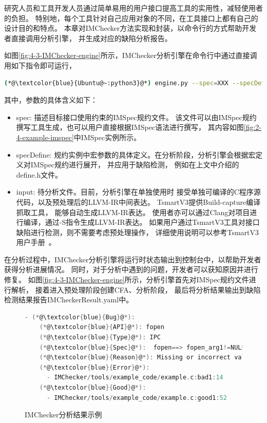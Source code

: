 研究人员和工具开发人员通过简单易用的用户接口提高工具的实用性，减轻使用者的负担。
特别地，每个工具针对自己应用对象的不同，在工具接口上都有自己的设计目的和特点。
本章对IMChecker方法实现和封装，以命令行的方式帮助开发者直接调用分析引擎，
并生成对应的缺陷分析报告。

如图\ref{fig:4-3-IMChecker-engine}所示，IMChecker分析引擎在命令行中通过直接调用如下指令即可运行，
\begin{lstlisting}[language={bash},
basicstyle=\linespread{0.8}\listingsfont,
numbers=none,
xleftmargin=.1\textwidth]
(*@\textcolor{blue}{Ubuntu@~:python3}@*) engine.py --spec=XXX --specDefine=XXX --input=XXX
\end{lstlisting}
其中，参数的具体含义如下：
\begin{itemize}
	\item spec: 描述目标接口使用约束的IMSpec规约文件。
	该文件可以由IMSpec规约撰写工具生成，也可以用户直接根据IMSpec语法进行撰写，
	其内容如图\ref{fig:2-4-example-imspec}中IMSpec实例所示。
	\item specDefine: 规约实例中宏参数的具体定义。在分析阶段，分析引擎会根据宏定义对IMSpec规约进行展开，
	并应用于缺陷检测，
	例如在上文中介绍的define.h文件。
	\item input: 待分析文件。目前，分析引擎在单独使用时
	接受单独可编译的C程序源代码，以及预处理后的LLVM-IR中间表达。
	TsmartV3提供Build-capture编译抓取工具，
	能够自动生成LLVM-IR表达。
	使用者亦可以通过Clang对项目进行编译，通过-S指令生成LLVM-IR表达。
	如果用户通过TsmartV3工具对接口缺陷进行检测，则不需要考虑预处理操作，
	详细使用说明可以参考TsmartV3用户手册~\cite{tsmart}。
\end{itemize}

在分析过程中，IMChecker分析引擎将运行时状态输出到控制台中，以帮助开发者获得分析进展情况。
同时，对于分析中遇到的问题，开发者可以获知原因并进行修复。
如图\ref{fig:4-3-IMChecker-engine}所示，分析引擎首先对IMSpec规约文件进行解析，
接着进入预处理阶段创建CFA、分析阶段，
最后将分析结果输出到缺陷检测结果报告IMCheckerResult.yaml中。

\begin{figure}[b]
	\centering
	\begin{minipage}{0.7\linewidth}
\begin{lstlisting}[language={C},
basicstyle=\linespread{0.7}\listingsfont,
numbers=none,frame=trBL,
xleftmargin=0pt]
  - (*@\textcolor{blue}{Bug}@*):
    (*@\textcolor{blue}{API}@*): fopen
    (*@\textcolor{blue}{Type}@*): IPC
    (*@\textcolor{blue}{Spec}@*):  fopen==> fopen_arg1!=NULL
    (*@\textcolor{blue}{Reason}@*): Missing or incorrect validation of parameter
    (*@\textcolor{blue}{Error}@*): 
      - IMChecker/tools/example_code/example.c:bad1:14
    (*@\textcolor{blue}{Good}@*): 
      - IMChecker/tools/example_code/example.c:good1:52
\end{lstlisting}
	\end{minipage}
	\caption{
		IMChecker分析结果示例
	}
	\label{fig:4-3-Result}
\end{figure}

